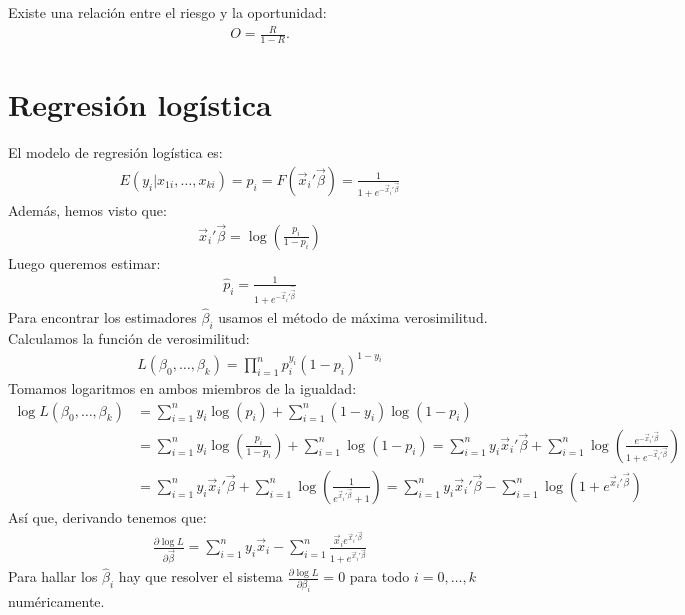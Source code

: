 \begin{obs}
Existe una relación entre el riesgo y la oportunidad:
\begin{align*}
    O = \frac{R}{1-R}.    
\end{align*}
\end{obs}

\section{Regresión logística}
\noindent El modelo de regresión logística es:
\begin{align*}
    E(y_i | x_{1i}, \dots, x_{ki}) = p_i = F(\vec{x}_i'\vec{\beta}) = \frac{1}{1 + e^{-\vec{x}_i'\vec{\beta}}}
\end{align*}
Además, hemos visto que:
\begin{align*}
    \vec{x}_i'\vec{\beta} = \log\left(\frac{p_i}{1-p_i}\right)
\end{align*}
Luego queremos estimar:
\begin{align*}
    \widehat{p}_i = \frac{1}{1 + e^{-\vec{x}_i'\widehat{\vec{\beta}}}}
\end{align*}
Para encontrar los estimadores $\widehat{\beta}_i$ usamos el método de máxima verosimilitud.
Calculamos la función de verosimilitud:
\begin{align*}
    L(\beta_0, \dots, \beta_k) = \prod_{i=1}^n p_i^{y_i}(1-p_i)^{1-y_i}
\end{align*}
Tomamos logaritmos en ambos miembros de la igualdad:
\begin{align*}
      \log L(\beta_0, \dots, \beta_k) &= \sum_{i=1}^n y_i\log(p_i) + \sum_{i=1}^n (1-y_i)\log(1-p_i)  \\
     & = \sum_{i=1}^n y_i\log\left(\frac{p_i}{1-p_i}\right) + \sum_{i=1}^n \log(1-p_i) = \sum_{i=1}^n y_i \vec{x}_i'\vec{\beta} + \sum_{i=1}^n \log\left(\frac{e^{-\vec{x}_i'\vec{\beta}}}{1 + e^{-\vec{x}_i'\vec{\beta}}}\right)  \\
     & = \sum_{i=1}^n y_i \vec{x}_i'\vec{\beta} + \sum_{i=1}^n \log\left(\frac{1}{e^{\vec{x}_i'\vec{\beta}} + 1}\right) = \sum_{i=1}^n y_i \vec{x}_i'\vec{\beta} - \sum_{i=1}^n \log(1 + e^{\vec{x}_i'\vec{\beta}})
\end{align*}
Así que, derivando tenemos que:
\begin{align*}
    \frac{\partial \log L}{\partial \vec{\beta}} = \sum_{i=1}^n y_i\vec{x}_i - \sum_{i=1}^n \frac{\vec{x}_i e^{\vec{x}_i'\vec{\beta}}}{1 + e^{\vec{x}_i'\vec{\beta}}}
\end{align*}
Para hallar los $\widehat{\beta}_i$ hay que resolver el sistema $\frac{\partial \log L}{\partial \beta_i} = 0$ para todo $i = 0, \dots, k$ numéricamente.

